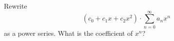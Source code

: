 Rewrite 
\[
(c_0 + c_1x + c_2 x^2) \cdot \sum_{n = 0}^\infty a_n x^n
\] 
as a
power series.
What is the coefficient of $x^n$?
